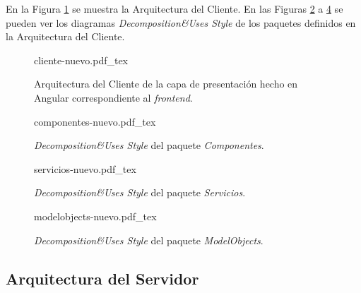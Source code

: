 En la Figura \ref{fig:arquitectura-cliente} se muestra la Arquitectura del Cliente.
En las Figuras \ref{fig:componentes-nuevo} a \ref{fig:arq-cli-dto}  se pueden ver los diagramas \textit{Decomposition\&Uses Style} de los paquetes definidos en la Arquitectura del Cliente.




\begin{figure}[H]
    \centering
    \begin{normalsize}
        {cliente-nuevo.pdf_tex}
    \end{normalsize}
    \caption{Arquitectura del Cliente de la capa de presentación hecho en Angular correspondiente al \textit{frontend}.}
     \label{fig:arquitectura-cliente}
 
 \end{figure}

 \begin{figure}
    \centering
    \begin{normalsize}
        {componentes-nuevo.pdf_tex}
    \end{normalsize}
    \caption{ \textit{Decomposition\&Uses Style} del paquete \textit{Componentes}.}
     \label{fig:componentes-nuevo}
 
 \end{figure}


 \begin{figure}
    \centering
    \begin{normalsize}
        {servicios-nuevo.pdf_tex}
    \end{normalsize}
    \caption{ \textit{Decomposition\&Uses Style} del paquete \textit{Servicios}.}
     \label{fig:arq-cli-com}
 
 \end{figure}

 \begin{figure}
    \centering
    \begin{normalsize}
        {modelobjects-nuevo.pdf_tex}
    \end{normalsize}
    \caption{ \textit{Decomposition\&Uses Style} del paquete \textit{ModelObjects}.}
     \label{fig:arq-cli-dto}
 
 \end{figure}

 


\subsection{Arquitectura del Servidor}

